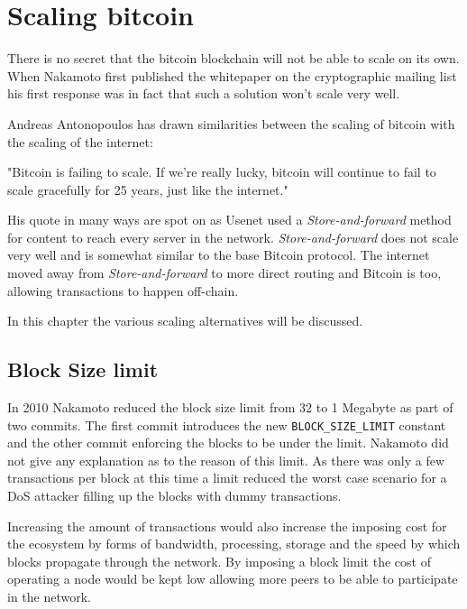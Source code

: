 \chapter{Scaling bitcoin}

There is no secret that the bitcoin blockchain will not be able to scale on its own. When Nakamoto first published the whitepaper on the cryptographic mailing list his first response was in fact that such a solution won't scale very well\cite{donald:scale}. 

Andreas Antonopoulos has drawn similarities between the scaling of bitcoin with the scaling of the internet:

\begin{displayquote}
	"Bitcoin is failing to scale. If we’re really lucky, bitcoin will continue to fail to scale gracefully for 25 years, just like the internet."\cite{antonopoulos:the:internet:of:money}
\end{displayquote}

His quote in many ways are spot on as Usenet used a \textit{Store-and-forward} method for content to reach every server in the network. \textit{Store-and-forward} does not scale very well and is somewhat similar to the base Bitcoin protocol. The internet moved away from \textit{Store-and-forward} to more direct routing and Bitcoin is too, allowing transactions to happen off-chain.

In this chapter the various scaling alternatives will be discussed.

\section{Block Size limit}

In 2010 Nakamoto reduced the block size limit from 32 to 1 Megabyte as part of two commits. The first commit introduces the new \texttt{BLOCK\_SIZE\_LIMIT} constant\cite{nakamoto:commit:1} and the other commit enforcing the blocks to be under the limit\cite{nakamoto:commit:2}. Nakamoto did not give any explanation as to the reason of this limit. As there was only a few transactions per block at this time a limit reduced the worst case scenario for a DoS attacker filling up the blocks with dummy transactions. 

Increasing the amount of transactions would also increase the imposing cost for the ecosystem by forms of bandwidth, processing, storage and the speed by which blocks propagate through the network. By imposing a block limit the cost of operating a node would be kept low allowing more peers to be able to participate in the network. 

